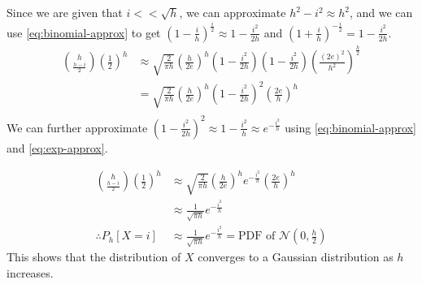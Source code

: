 Since we are given that $i << \sqrt{h}$, we can approximate $h^2-i^2 \approx h^2$, and we can use \cref{eq:binomial-approx} to get $\left(1-\frac{i}{h}\right)^\frac{i}{2} \approx 1-\frac{i^2}{2h}$ and $\left(1+\frac{i}{h}\right)^{-\frac{i}{2}} = 1 - \frac{i^2}{2h} $.
\begin{align*}
	\binom{h}{\frac{h-i}{2}}\left(\frac{1}{2}\right)^h & \approx \sqrt{\frac{2}{\pi h}}\left(\frac{h}{2e}\right)^h \left(1-\frac{i^2}{2h}\right)\left(1-\frac{i^2}{2h}\right)\left(\frac{(2e)^2}{h^2}\right)^\frac{h}{2} \\
	                                                   & = \sqrt{\frac{2}{\pi h}}\left(\frac{h}{2e}\right)^h \left(1-\frac{i^2}{2h}\right)^2\left(\frac{2e}{h}\right)^h                                                  \\
\end{align*}
We can further approximate $\left(1-\frac{i^2}{2h}\right)^2 \approx 1 - \frac{i^2}{h} \approx e^{-\frac{i^2}{h}}$ using \cref{eq:binomial-approx} and \cref{eq:exp-approx}.

\begin{align*}
	\binom{h}{\frac{h-i}{2}}\left(\frac{1}{2}\right)^h & \approx \sqrt{\frac{2}{\pi h}}\left(\frac{h}{2e}\right)^h e^{-\frac{i^2}{h}}\left(\frac{2e}{h}\right)^h     \\
	                                                   & \approx \frac{1}{\sqrt{\pi h}} e^{-\frac{i^2}{h}}                                                           \\
	\therefore P_h[X=i]                                & \approx \frac{1}{\sqrt{\pi h}} e^{-\frac{i^2}{h}} = \textrm{PDF of } \mathcal{N}\left(0, \frac{h}{2}\right)
\end{align*}
This shows that the distribution of $X$ converges to a Gaussian distribution as $h$ increases.

